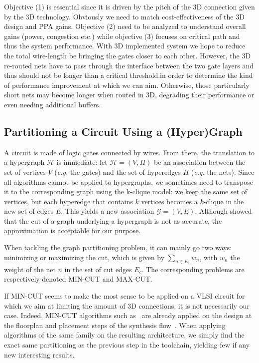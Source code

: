 \documentclass[conference]{IEEEtran}
\begin{document}
Objective (1) is essential since it is driven by the pitch of the 3D connection given by the 3D technology. Obviously we need to match cost-effectiveness of the 3D design and PPA gains. Objective (2) need to be analyzed to understand overall gains (power, congestion etc.) while objective (3) focuses on critical path and thus the system performance. With 3D implemented system we hope to reduce the total wire-length be bringing the gates closer to each other. However, the 3D re-routed nets have to pass through the interface between the two gate layers and thus should not be longer than a critical threshold.in order to determine the kind of performance improvement at which we can aim. 
Otherwise, those particularly short nets may become longer when routed in 3D, degrading their performance or even needing additional buffers.

\subsection{Partitioning a Circuit Using a (Hyper)Graph}
A circuit is made of logic gates connected by wires.
From there, the translation to a hypergraph $\mathcal{H}$ is immediate: let $\mathcal{H} = (V, H)$ be an association between the set of vertices $V$ (\textit{e.g.} the gates) and the set of hyperedges $H$ (\textit{e.g.} the nets). %
Since all algorithms cannot be applied to hypergraphs, we sometimes need to transpose it to the corresponding graph using the k-clique model: we keep the same set of vertices, but each hyperedge that contains $k$ vertices becomes a $k$-clique in the new set of edges $E$.
This yields a new association $\mathcal{G} = (V, E)$.
Although \cite{IhlerEdmund;WagnerDorothea;Wagner1993} showed that the cut of a graph underlying a hypergraph is not as accurate, the approximation is acceptable for our purpose.

When tackling the graph partitioning problem, it can mainly go two ways: minimizing or maximizing the cut, which is given by $\sum_{n \in E_c} w_{n}$, with $w_n$ the weight of the net $n$ in the set of cut edges $E_c$.
The corresponding problems are respectively denoted MIN-CUT and MAX-CUT.

If MIN-CUT seems to make the most sense to be applied on a VLSI circuit for which we aim at limiting the amount of 3D connections, it is not necessarily our case.
Indeed, MIN-CUT algorithms such as~\cite{Karypis1999} are already applied on the design at the floorplan and placement steps of the synthesis flow~\cite{KahngAndrewB.Lienig2011}.
When applying algorithms of the same family on the resulting architecture, we simply find the exact same partitioning as the previous step in the toolchain, yielding few if any new interesting results.
\end{document}

